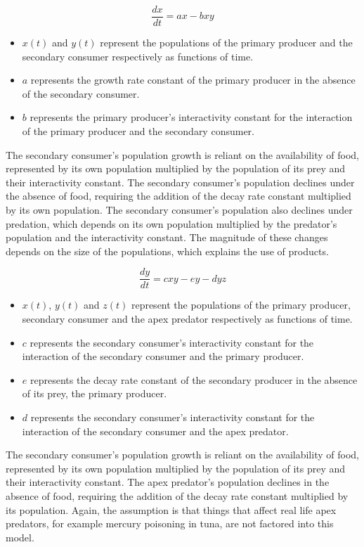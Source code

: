 \documentclass[11pt,oneside]{article}
\begin{document}
	\begin{equation}
	\frac{dx}{dt} = ax - bxy
	\end{equation}
	\begin{itemize}
		\item $x(t)$ and $y(t)$ represent the populations of the primary producer and the secondary consumer respectively as functions of time.
		\item $a$ represents the growth rate constant of the primary producer in the absence of the secondary consumer.
		\item $b$ represents the primary producer's interactivity constant for the interaction of the primary producer and the secondary consumer.
	\end{itemize}
	
	The secondary consumer's population growth is reliant on the availability of food, represented by its own population multiplied by the population of its prey and their interactivity constant. The secondary consumer's population declines under the absence of food, requiring the addition of the decay rate constant multiplied by its own population. The secondary consumer's population also declines under predation, which depends on its own population multiplied by the predator's population and the interactivity constant. The magnitude of these changes depends on the size of the populations, which explains the use of products.
	
	\begin{equation}
	\frac{dy}{dt} = cxy - ey -dyz
	\end{equation}
	\begin{itemize}
		\item $x(t)$, $y(t)$ and $z(t)$ represent the populations of the primary producer, secondary consumer and the apex predator respectively as functions of time.
		\item $c$ represents the secondary consumer's interactivity constant for the interaction of the secondary consumer and the primary producer.
		\item $e$ represents the decay rate constant of the secondary producer in the absence of its prey, the primary producer.
		\item $d$ represents the secondary consumer's interactivity constant for the interaction of the secondary consumer and the apex predator.
	\end{itemize}
	
	The secondary consumer's population growth is reliant on the availability of food, represented by its own population multiplied by the population of its prey and their interactivity constant. The apex predator's population declines in the absence of food, requiring the addition of the decay rate constant multiplied by its population. Again, the assumption is that things that affect real life apex predators, for example mercury poisoning in tuna, are not factored into this model.
	
\end{document}
